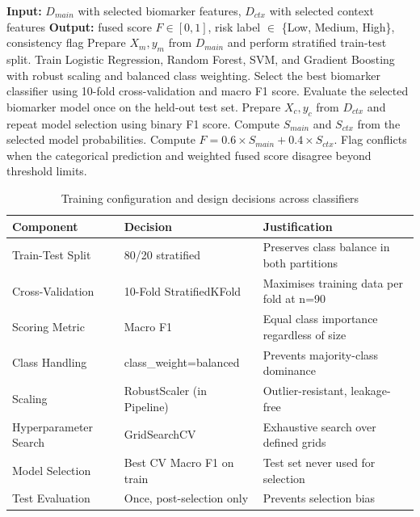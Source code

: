 \begin{algorithm}[ht]
\caption{Dual-pipeline model building and weighted fusion procedure}
\label{alg:fusion-procedure}
\begin{algorithmic}[1]
\State \textbf{Input:} $D_{main}$ with selected biomarker features, $D_{ctx}$ with selected context features
\State \textbf{Output:} fused score $F \in [0,1]$, risk label $\in$ \{Low, Medium, High\}, consistency flag
\State Prepare $X_m, y_m$ from $D_{main}$ and perform stratified train-test split.
\State Train Logistic Regression, Random Forest, SVM, and Gradient Boosting with robust scaling and balanced class weighting.
\State Select the best biomarker classifier using 10-fold cross-validation and macro F1 score.
\State Evaluate the selected biomarker model once on the held-out test set.
\State Prepare $X_c, y_c$ from $D_{ctx}$ and repeat model selection using binary F1 score.
\State Compute $S_{main}$ and $S_{ctx}$ from the selected model probabilities.
\State Compute $F = 0.6 \times S_{main} + 0.4 \times S_{ctx}$.
\State Flag conflicts when the categorical prediction and weighted fused score disagree beyond threshold limits.
\end{algorithmic}
\end{algorithm}

\clearpage

\begin{table}[!p]
\small
\centering
\caption{Training configuration and design decisions across classifiers}
\label{tab:training-config}
\begin{tabular}{lll}
\toprule
\textbf{Component} & \textbf{Decision} & \textbf{Justification} \\
\midrule
Train-Test Split & 80/20 stratified & Preserves class balance in both partitions \\
Cross-Validation & 10-Fold StratifiedKFold & Maximises training data per fold at n=90 \\
Scoring Metric & Macro F1 & Equal class importance regardless of size \\
Class Handling & class\_weight=balanced & Prevents majority-class dominance \\
Scaling & RobustScaler (in Pipeline) & Outlier-resistant, leakage-free \\
Hyperparameter Search & GridSearchCV & Exhaustive search over defined grids \\
Model Selection & Best CV Macro F1 on train & Test set never used for selection \\
Test Evaluation & Once, post-selection only & Prevents selection bias \\
\bottomrule
\end{tabular}
\end{table}

